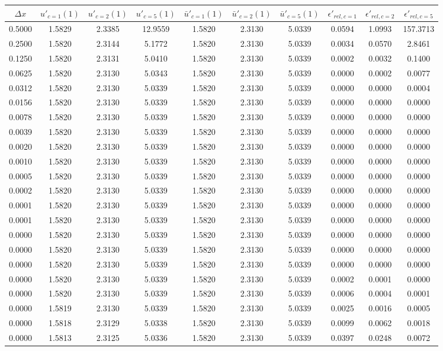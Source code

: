 \begin{tabular}{|c|c|c|c|c|c|c|c|c|c|}
\hline
\textbf{$\Delta x$}&\textbf{$u'_{c=1}(1)$}&\textbf{$u'_{c=2}(1)$}&\textbf{$u'_{c=5}(1)$}&\textbf{$\bar{u}'_{c=1}(1)$}&\textbf{$\bar{u}'_{c=2}(1)$}&\textbf{$\bar{u}'_{c=5}(1)$}&\textbf{$\epsilon'_{rel,c=1}$}&\textbf{$\epsilon'_{rel,c=2}$}&\textbf{$\epsilon'_{rel,c=5}$}\\\hline
0.5000&1.5829&2.3385&12.9559&1.5820&2.3130&5.0339&0.0594&1.0993&157.3713\\\hline
0.2500&1.5820&2.3144&5.1772&1.5820&2.3130&5.0339&0.0034&0.0570&2.8461\\\hline
0.1250&1.5820&2.3131&5.0410&1.5820&2.3130&5.0339&0.0002&0.0032&0.1400\\\hline
0.0625&1.5820&2.3130&5.0343&1.5820&2.3130&5.0339&0.0000&0.0002&0.0077\\\hline
0.0312&1.5820&2.3130&5.0339&1.5820&2.3130&5.0339&0.0000&0.0000&0.0004\\\hline
0.0156&1.5820&2.3130&5.0339&1.5820&2.3130&5.0339&0.0000&0.0000&0.0000\\\hline
0.0078&1.5820&2.3130&5.0339&1.5820&2.3130&5.0339&0.0000&0.0000&0.0000\\\hline
0.0039&1.5820&2.3130&5.0339&1.5820&2.3130&5.0339&0.0000&0.0000&0.0000\\\hline
0.0020&1.5820&2.3130&5.0339&1.5820&2.3130&5.0339&0.0000&0.0000&0.0000\\\hline
0.0010&1.5820&2.3130&5.0339&1.5820&2.3130&5.0339&0.0000&0.0000&0.0000\\\hline
0.0005&1.5820&2.3130&5.0339&1.5820&2.3130&5.0339&0.0000&0.0000&0.0000\\\hline
0.0002&1.5820&2.3130&5.0339&1.5820&2.3130&5.0339&0.0000&0.0000&0.0000\\\hline
0.0001&1.5820&2.3130&5.0339&1.5820&2.3130&5.0339&0.0000&0.0000&0.0000\\\hline
0.0001&1.5820&2.3130&5.0339&1.5820&2.3130&5.0339&0.0000&0.0000&0.0000\\\hline
0.0000&1.5820&2.3130&5.0339&1.5820&2.3130&5.0339&0.0000&0.0000&0.0000\\\hline
0.0000&1.5820&2.3130&5.0339&1.5820&2.3130&5.0339&0.0000&0.0000&0.0000\\\hline
0.0000&1.5820&2.3130&5.0339&1.5820&2.3130&5.0339&0.0000&0.0000&0.0000\\\hline
0.0000&1.5820&2.3130&5.0339&1.5820&2.3130&5.0339&0.0002&0.0001&0.0000\\\hline
0.0000&1.5820&2.3130&5.0339&1.5820&2.3130&5.0339&0.0006&0.0004&0.0001\\\hline
0.0000&1.5819&2.3130&5.0339&1.5820&2.3130&5.0339&0.0025&0.0016&0.0005\\\hline
0.0000&1.5818&2.3129&5.0338&1.5820&2.3130&5.0339&0.0099&0.0062&0.0018\\\hline
0.0000&1.5813&2.3125&5.0336&1.5820&2.3130&5.0339&0.0397&0.0248&0.0072\\\hline
\end{tabular}
